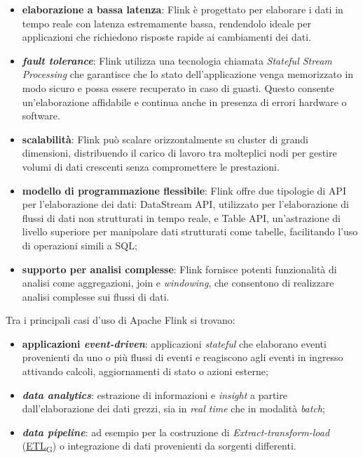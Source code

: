 \begin{itemize}
	\item \textbf{elaborazione a bassa latenza}: Flink è progettato per elaborare i dati in tempo reale con latenza estremamente bassa, rendendolo ideale per applicazioni che richiedono risposte rapide ai cambiamenti dei dati.
	\item \textbf{\textit{fault tolerance}}: Flink utilizza una tecnologia chiamata \textit{Stateful Stream Processing} che garantisce che lo stato dell'applicazione venga memorizzato in modo sicuro e possa essere recuperato in caso di guasti. Questo consente un'elaborazione affidabile e continua anche in presenza di errori hardware o software.
	\item \textbf{scalabilità}: Flink può scalare orizzontalmente su cluster di grandi dimensioni, distribuendo il carico di lavoro tra molteplici nodi per gestire volumi di dati crescenti senza compromettere le prestazioni.
	\item \textbf{modello di programmazione flessibile}: Flink offre due tipologie di API per l'elaborazione dei dati: DataStream API, utilizzato per l'elaborazione di flussi di dati non strutturati in tempo reale, e Table API, un'astrazione di livello superiore per manipolare dati strutturati come tabelle, facilitando l'uso di operazioni simili a SQL;
	\item \textbf{supporto per analisi complesse}: Flink fornisce potenti funzionalità di analisi come aggregazioni, join e \textit{windowing}, che consentono di realizzare analisi complesse sui flussi di dati.
\end{itemize}

Tra i principali casi d'uso di Apache Flink si trovano:
\begin{itemize}
	\item \textbf{applicazioni \textit{event-driven}}: applicazioni \textit{stateful} che elaborano eventi provenienti da uno o più flussi di eventi e reagiscono agli eventi in ingresso attivando calcoli, aggiornamenti di stato o azioni esterne;
	\item \textbf{\textit{data analytics}}: estrazione di informazioni e \textit{insight} a partire dall'elaborazione dei dati grezzi, sia in \textit{real time} che in modalità \textit{batch};
	\item \textbf{\textit{data pipeline}}: ad esempio per la costruzione di \textit{Extract-transform-load} (\href{https://7last.github.io/docs/pb/documentazione-interna/glossario\#extract-transform-load}{ETL\textsubscript{G}}) o integrazione di dati provenienti da sorgenti differenti.
\end{itemize}

